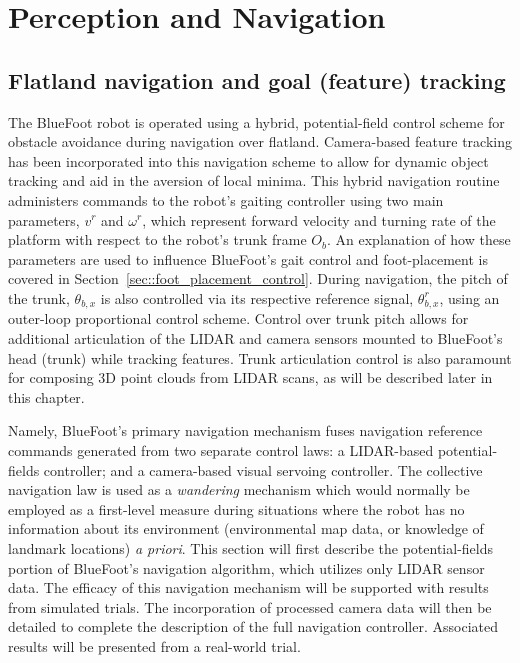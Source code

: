 \chapter{Perception and Navigation}
\label{ch::navigation}


	\section{Flatland navigation and goal (feature) tracking}
	
		The BlueFoot robot is operated using a hybrid, potential-field control scheme for obstacle avoidance during navigation over flatland. Camera-based feature tracking has been incorporated into this navigation scheme to allow for dynamic object tracking and aid in the aversion of local minima. This hybrid navigation routine administers commands to the robot's gaiting controller using two main parameters, $v^{r}$ and $\omega^{r}$, which represent forward velocity and turning rate of the platform with respect to the robot's trunk frame $O_{b}$. An explanation of how these parameters are used to influence BlueFoot's gait control and foot-placement is covered in Section~\ref{sec::foot_placement_control}. During navigation, the pitch of the trunk, $\theta_{b,x}$ is also controlled via its respective reference signal, $\theta_{b,x}^{r}$, using an outer-loop proportional control scheme. Control over trunk pitch allows for additional articulation of the LIDAR and camera sensors mounted to BlueFoot's head (trunk) while tracking features. Trunk articulation control is also paramount for composing 3D point clouds from LIDAR scans, as will be described later in this chapter.

		Namely, BlueFoot's primary navigation mechanism fuses navigation reference commands generated from two separate control laws: a LIDAR-based potential-fields controller; and a camera-based visual servoing controller. The collective navigation law is used as a \emph{wandering} mechanism which would normally be employed as a first-level measure during situations where the robot has no information about its environment (\IE environmental map data, or knowledge of landmark locations) \emph{a priori}. This section will first describe the potential-fields portion of BlueFoot's navigation algorithm, which utilizes only LIDAR sensor data. The efficacy of this navigation mechanism will be supported with results from simulated trials. The incorporation of processed camera data will then be detailed to complete the description of the full navigation controller. Associated results will be presented from a real-world trial.


